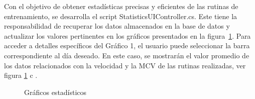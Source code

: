 Con el objetivo de obtener estadísticas precisas y eficientes de las rutinas de entrenamiento, se desarrolla el script StatisticsUIController.cs. 
Este tiene la responsabilidad de recuperar los datos almacenados en la base de datos y actualizar los valores pertinentes en 
los gráficos presentados en la figura~\ref{fig: statics-graphs}. Para acceder a detalles específicos del Gráfico 1, el usuario puede 
seleccionar la barra correspondiente al día deseado. En este caso, se mostrarán el valor promedio %
de los datos relacionados con la velocidad y la MCV de las rutinas realizadas, ver figura \ref{fig: statics-graphs} c  .

\begin{figure}[ht]
    \centering

    \caption{Gráficos estadísticos}
    \label{fig: statics-graphs}
\end{figure}

